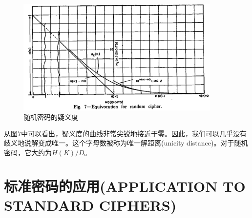 \documentclass[]{article}
\begin{document}
\begin{figure}[htbp]
	\centering
	\includegraphics[width=0.9\textwidth]{fig7.png}
	\caption{随机密码的疑义度}
	\label{fig:fig7}
\end{figure}

从图7中可以看出，疑义度的曲线非常尖锐地接近于零。因此，我们可以几乎没有歧义地说解变成唯一。这个字母数被称为唯一解距离(unicity distance)。对于随机密码，它大约为$H(K)/D$。

\newpage
%   
%

\section{标准密码的应用(APPLICATION TO STANDARD CIPHERS)}
\end{document}
